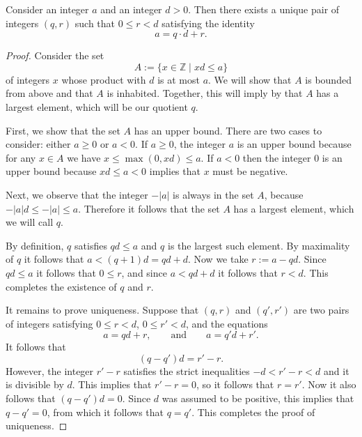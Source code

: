 \begin{theorem}\label{theorem:euclidean-division}
  Consider an integer $a$ and an integer $d>0$. Then there exists a unique pair of integers $(q,r)$ such that $0\leq r<d$ satisfying the identity
  \begin{equation*}
    a= q\cdot d + r.
  \end{equation*}
\end{theorem}

\begin{proof}
  Consider the set
  \begin{equation*}
    A:=\{x\in\mathbb{Z} \mid xd\leq a\}
  \end{equation*}
  of integers $x$ whose product with $d$ is at most $a$. We will show that $A$ is bounded from above and that $A$ is inhabited. Together, this will imply by  that $A$ has a largest element, which will be our quotient $q$.

  First, we show that the set $A$ has an upper bound. There are two cases to consider: either $a\geq 0$ or $a<0$. If $a\geq 0$, the integer $a$ is an upper bound because for any $x\in A$ we have $x \leq \max(0,xd)\leq a$. If $a<0$ then the integer $0$ is an upper bound because $xd\leq a<0$ implies that $x$ must be negative.

  Next, we observe that the integer $-|a|$ is always in the set $A$, because $-|a|d \leq -|a|\leq a$. Therefore it follows that the set $A$ has a largest element, which we will call $q$.

  By definition, $q$ satisfies $qd\leq a$ and $q$ is the largest such element. By maximality of $q$ it follows that $a < (q+1)d=qd + d$. Now we take $r:= a-qd$. Since $qd\leq a$ it follows that $0\leq r$, and since $a< qd+d$ it follows that $r<d$. This completes the existence of $q$ and $r$.

  It remains to prove uniqueness. Suppose that $(q,r)$ and $(q',r')$ are two pairs of integers satisfying $0\leq r<d$, $0\leq r'<d$, and the equations
  \begin{equation*}
    a=qd+r,\qquad\text{and}\qquad{}a=q'd+r'.
  \end{equation*}
  It follows that
  \begin{equation*}
    (q-q')d=r'-r.
  \end{equation*}
  However, the integer $r'-r$ satisfies the strict inequalities $-d<r'-r<d$ and it is divisible by $d$. This implies that $r'-r=0$, so it follows that $r=r'$. Now it also follows that $(q-q')d=0$. Since $d$ was assumed to be positive, this implies that $q-q'=0$, from which it follows that $q=q'$. This completes the proof of uniqueness.
\end{proof}

